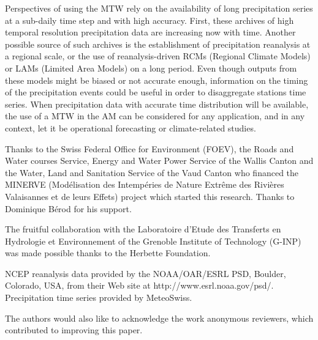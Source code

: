 \documentclass[hess, manuscript]{copernicus}
\begin{document}
Perspectives of using the MTW rely on the availability of long precipitation series at a sub-daily time step and with high accuracy. First, these archives of high temporal resolution precipitation data are increasing now with time. Another possible source of such archives is the establishment of precipitation reanalysis at a regional scale, or the use of reanalysis-driven RCMs (Regional Climate Models) or LAMs (Limited Area Models) on a long period. Even though outputs from these models might be biased or not accurate enough, information on the timing of the precipitation events could be useful in order to disaggregate stations time series. When precipitation data with accurate time distribution will be available, the use of a MTW in the AM can be considered for any application, and in any context, let it be operational forecasting or climate-related studies.



\begin{acknowledgements}
Thanks to the Swiss Federal Office for Environment (FOEV), the Roads and Water courses Service, Energy and Water Power Service of the Wallis Canton and the Water, Land and Sanitation Service of the Vaud Canton who financed the MINERVE (Mod\'{e}lisation des Intemp\'{e}ries de Nature Extr\^{e}me des Rivi\`{e}res Valaisannes et de leurs Effets) project which started this research. Thanks to Dominique B\'{e}rod for his support.

The fruitful collaboration with the Laboratoire d'Etude des Transferts en Hydrologie et Environnement of the Grenoble Institute of Technology (G-INP) was made possible thanks to the Herbette Foundation. 

NCEP reanalysis data provided by the NOAA/OAR/ESRL PSD, Boulder, Colorado, USA, from their Web site at http://www.esrl.noaa.gov/psd/. Precipitation time series provided by MeteoSwiss.

The authors would also like to acknowledge the work anonymous reviewers, which contributed to improving this paper. 
\end{acknowledgements}






\end{document}
